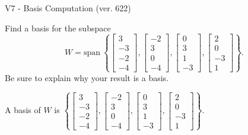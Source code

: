 \begin{exercise}
  \begin{exerciseTitle}V7 - Basis Computation (ver. 622)\end{exerciseTitle}
  \begin{exerciseStatement}
    Find a basis for the subspace 
\[W=\mathrm{span}\ \left\{\left[\begin{array}{r}
3 \\
-3 \\
-2 \\
-4
\end{array}\right] , \left[\begin{array}{r}
-2 \\
3 \\
0 \\
-4
\end{array}\right] , \left[\begin{array}{r}
0 \\
3 \\
1 \\
-3
\end{array}\right] , \left[\begin{array}{r}
2 \\
0 \\
-3 \\
1
\end{array}\right]\right\}.\]
 Be sure to explain why your result is a basis.


  \end{exerciseStatement}
  \begin{exerciseAnswer}
   A basis of \(W\) is  \(\left\{\left[\begin{array}{r}
3 \\
-3 \\
-2 \\
-4
\end{array}\right] , \left[\begin{array}{r}
-2 \\
3 \\
0 \\
-4
\end{array}\right] , \left[\begin{array}{r}
0 \\
3 \\
1 \\
-3
\end{array}\right] , \left[\begin{array}{r}
2 \\
0 \\
-3 \\
1
\end{array}\right]\right\}\).
  


  \end{exerciseAnswer}
\end{exercise}